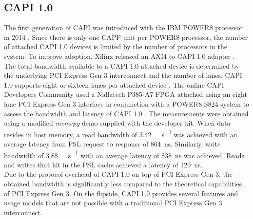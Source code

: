 \subsection{CAPI 1.0}
\label{sec:capi-1.0}
The first generation of CAPI was introduced with the IBM POWER8 processor in 2014 \cite{capi-white}. Since there is only one CAPP unit per POWER8 processor, the number of attached CAPI 1.0 devices is limited by the number of processors in the system. To improve adoption, Xilinx released an AXI4 to CAPI 1.0 adapter \cite{xilinx-xapp1293}.\\
The total bandwidth available to a CAPI 1.0 attached device is determined by the underlying PCI Express Gen 3 interconnect and the number of lanes. CAPI 1.0 supports eight or sixteen lanes per attached device \cite{opencapi-enablement}. The online CAPI Developers Community used a Nallatech P385-A7 FPGA attached using an eight lane PCI Express Gen 3 interface in conjunction with a POWER8 S824 system to assess the bandwidth and latency of CAPI 1.0 \cite{capi-bw}. The measurements were obtained using a modified \textit{memcpy} demo supplied with the developer kit. When data resides in host memory, a read bandwidth of \SI{3.42}{\giga\byte\per\second} was achieved with an average latency from PSL request to response of \SI{864}{\nano\second}. Similarly, write bandwidth of \SI{3.88}{\giga\byte\per\second} with an average latency of \SI{838}{\nano\second} was achieved. Reads and writes that hit in the PSL cache achieved a latency of \SI{120}{\nano\second}.\\
Due to the protocol overhead of CAPI 1.0 on top of PCI Express Gen 3, the obtained bandwidth is significantly less compared to the theoretical capabilities of PCI Express Gen 3. On the flipside, CAPI 1.0 provides several features and usage models that are not possible with a traditional PCI Express Gen 3 interconnect.





